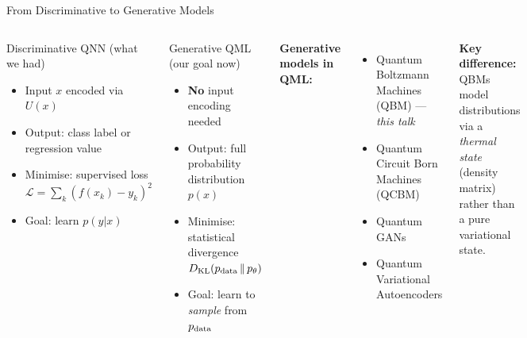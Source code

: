 \documentclass[aspectratio=169,10pt]{beamer}
\newcommand{\KL}[2]{D_{\mathrm{KL}}\!\left(#1\,\|\,#2\right)}
\begin{document}
\begin{frame}{From Discriminative to Generative Models}
  \begin{columns}[T]
      \begin{block}{Discriminative QNN (what we had)}
        \begin{itemize}
          \item Input $x$ encoded via $U(x)$
          \item Output: class label or regression value
          \item Minimise: supervised loss
            $\mathcal{L} = \sum_k (f(x_k)-y_k)^2$
          \item Goal: learn $p(y|x)$
        \end{itemize}
      \end{block}
      \vspace{0.3cm}
      \begin{alertblock}{Generative QML (our goal now)}
        \begin{itemize}
          \item \textbf{No} input encoding needed
          \item Output: full probability distribution $p(x)$
          \item Minimise: statistical divergence
            $\KL{p_{\rm data}}{p_\theta}$
          \item Goal: learn to \emph{sample} from $p_{\rm data}$
        \end{itemize}
      \end{alertblock}
      \textbf{Generative models in QML:}
      \begin{itemize}
        \item Quantum Boltzmann Machines (QBM) — \emph{this talk}
        \item Quantum Circuit Born Machines (QCBM)
        \item Quantum GANs
        \item Quantum Variational Autoencoders
      \end{itemize}
      \vspace{0.3cm}
      \textbf{Key difference:}\\
      QBMs model distributions via a \emph{thermal state}
      (density matrix) rather than a pure variational state.
  \end{columns}
\end{frame}

\end{document}
